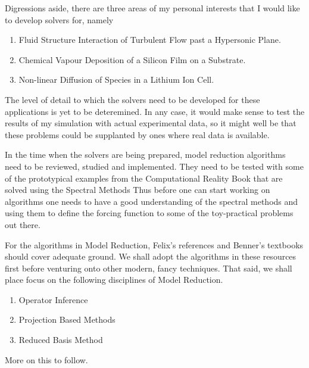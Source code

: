 \documentclass{article}
\begin{document}
Digressions aside, there are three areas of my personal interests that I would like to develop solvers for, namely
\begin{enumerate}
    \item Fluid Structure Interaction of Turbulent Flow past a Hypersonic Plane.
    \item Chemical Vapour Deposition of a Silicon Film on a Substrate.
    \item Non-linear Diffusion of Species in a Lithium Ion Cell.
\end{enumerate}

The level of detail to which the solvers need to be developed for these applications is yet to be deteremined.
In any case, it would make sense to test the results of my simulation with actual experimental data, so it might well be that these problems could be supplanted by ones where real data is available.

In the time when the solvers are being prepared, model reduction algorithms need to be reviewed, studied and implemented.
They need to be tested with some of the prototypical examples from the Computational Reality Book that are solved using the Spectral Methods
Thus before one can start working on algorithms one needs to have a good understanding of the spectral methods and using them to define the forcing function to some of the toy-practical problems out there.

For the algorithms in Model Reduction, Felix's references and Benner's textbooks should cover adequate ground. We shall adopt the algorithms in these resources first before venturing onto other modern, fancy techniques.
That said, we shall place focus on the following disciplines of Model Reduction.
\begin{enumerate}
    \item Operator Inference
    \item Projection Based Methods
    \item Reduced Basis Method
\end{enumerate}

More on this to follow.
\end{document}
